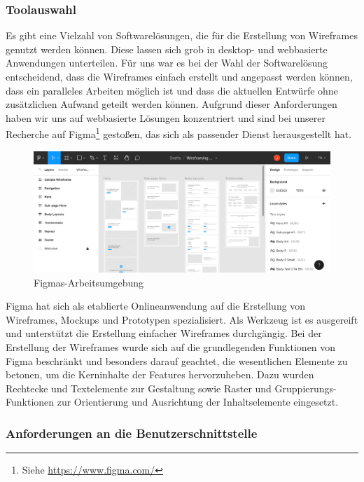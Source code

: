 \subsubsection{Toolauswahl}

Es gibt eine Vielzahl von Softwarelösungen, die für die Erstellung von Wireframes genutzt werden können. Diese lassen sich grob in desktop- und webbasierte Anwendungen unterteilen. Für uns war es bei der Wahl der Softwarelösung entscheidend, dass die Wireframes einfach erstellt und angepasst werden können, dass ein paralleles Arbeiten möglich ist und dass die aktuellen Entwürfe ohne zusätzlichen Aufwand geteilt werden können. Aufgrund dieser Anforderungen haben wir uns auf webbasierte Lösungen konzentriert und sind bei unserer Recherche auf Figma\footnote{Siehe \url{https://www.figma.com/}} gestoßen, das sich als passender Dienst herausgestellt hat.

\begin{figure}[!htb]
    \centering
    \includegraphics[width=\textwidth]{figures/jan/Wire_Figma.png}
    \caption[Figmas-Arbeitsumgebung]{Figmas-Arbeitsumgebung}
    \label{fig:figma}
\end{figure}

Figma hat sich als etablierte Onlineanwendung auf die Erstellung von Wireframes, Mockups und Prototypen spezialisiert. Als Werkzeug ist es ausgereift und unterstützt die Erstellung einfacher Wireframes durchgängig. Bei der Erstellung der Wireframes wurde sich auf die grundlegenden Funktionen von Figma beschränkt und besonders darauf geachtet, die wesentlichen Elemente zu betonen, um die Kerninhalte der Features hervorzuheben. Dazu wurden Rechtecke und Textelemente zur Gestaltung sowie Raster und Gruppierungs-Funktionen zur Orientierung und Ausrichtung der Inhaltselemente eingesetzt.

\subsubsection{Anforderungen an die Benutzerschnittstelle}

